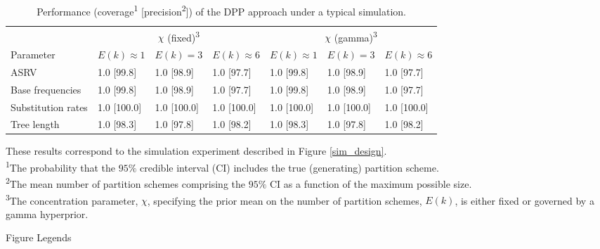 \documentclass[11pt]{article}
\begin{document}
\newpage
\begin{table}[h!]
\caption{Performance (coverage\textsuperscript{1} [precision\textsuperscript{2}]) of the DPP approach under a typical simulation.}
\centering
\begin{tabular}{lllllll}
\toprule
& \multicolumn{3}{c}{$\chi$ (fixed)\textsuperscript{3}}  & \multicolumn{3}{c}{$\chi$ (gamma)\textsuperscript{3}} \\
\cmidrule(r){2-4} \cmidrule(r){5-7}
Parameter & $E(k) \approx 1$ & $E(k) =3$ & $E(k) \approx 6$ & $E(k) \approx 1$ & $E(k) =3$ & $E(k) \approx 6$ \\ 
\midrule
ASRV & 1.0 [99.8] & 1.0 [98.9] & 1.0 [97.7] & 1.0 [99.8] & 1.0 [98.9] & 1.0 [97.7] \\ 
\rowcolor{gray!20}
Base frequencies & 1.0 [99.8] & 1.0 [98.9] & 1.0 [97.7] & 1.0 [99.8] & 1.0 [98.9] & 1.0 [97.7] \\ 
Substitution rates & 1.0 [100.0] & 1.0 [100.0] & 1.0 [100.0] & 1.0 [100.0] & 1.0 [100.0] & 1.0 [100.0]  \\ 
\rowcolor{gray!20}
Tree length & 1.0 [98.3] & 1.0 [97.8] & 1.0 [98.2] & 1.0 [98.3] & 1.0 [97.8] & 1.0 [98.2]  \\ 
\end{tabular}

\medskip
{\fontsize{9}{9}\selectfont
\begin{adjustwidth}{.2cm}{.1cm}
These results correspond to the simulation experiment described in Figure \ref{sim_design}.\\
\textsuperscript{1}The probability that the $95\%$ credible interval (CI) includes the true (generating) partition scheme.\\
\textsuperscript{2}The mean number of partition schemes comprising the $95\%$ CI as a function of the maximum possible size.\\
\textsuperscript{3}The concentration parameter, $\chi$, specifying the prior mean on the number of partition schemes, $E(k)$, is either fixed or governed by a gamma hyperprior.
\end{adjustwidth}}
\label{tab:simulation}
\end{table}

\newpage

\begin{center}
{\sc Figure Legends}
\end{center}
\end{document}
